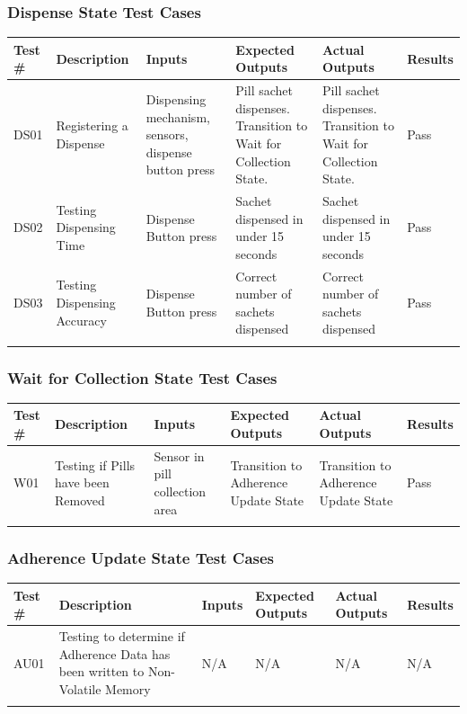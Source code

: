 \documentclass[12pt]{article}
\begin{document}
\subsubsection{Dispense State Test Cases}
\begin{tabularx}{\textwidth}{|X|X|X|X|X|X|}
        \hline
        Test \#     & Description     & Inputs      & Expected Outputs  & Actual Outputs    & Results   \\
        \hline
         DS01     & Registering a Dispense    & Dispensing mechanism, sensors, dispense button press     & Pill sachet dispenses. Transition to Wait for Collection State.   & Pill sachet dispenses. Transition to Wait for Collection State.     & Pass   \\
        \hline
         DS02     & Testing Dispensing Time   &  Dispense Button press     & Sachet dispensed in under 15 seconds   & Sachet dispensed in under 15 seconds & Pass   \\
        \hline
         DS03     & Testing Dispensing Accuracy     & Dispense Button press     & Correct number of sachets dispensed   & Correct number of sachets dispensed     & Pass   \\
        \hline
    \caption{Dispense State} %
\end{tabularx}

\subsubsection{Wait for Collection State Test Cases}
\begin{tabularx}{\textwidth}{|X|X|X|X|X|X|}
        \hline
        Test \#     & Description     & Inputs      & Expected Outputs  & Actual Outputs    & Results   \\
        \hline
         W01     & Testing if Pills have been Removed    & Sensor in pill collection area     & Transition to Adherence Update State   & Transition to Adherence Update State     & Pass   \\
        \hline
    \caption{Wait for Collection State} %
\end{tabularx}

\subsubsection{Adherence Update State Test Cases}
\begin{tabularx}{\textwidth}{|X|X|X|X|X|X|}
        \hline
        Test \#     & Description     & Inputs      & Expected Outputs  & Actual Outputs    & Results   \\
        \hline
         AU01     & Testing to determine if Adherence Data has been written to Non-Volatile Memory    & N/A     & N/A   & N/A     & N/A   \\
        \hline
    \caption{Adherence Update State} %
\end{tabularx}
\end{document}
